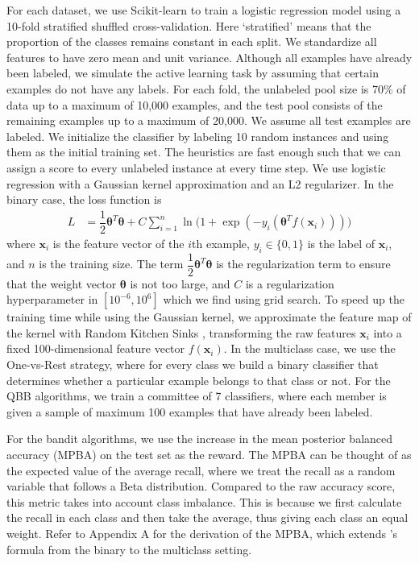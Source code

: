 \documentclass[fleqn,10pt,lineno]{wlpeerj} %
\begin{document}
For each dataset, we use Scikit-learn \citep{pedregosa11} to train a logistic
regression model using a 10-fold stratified shuffled cross-validation.
Here `stratified' means that the proportion of the classes remains constant in each
split. We standardize all features to have zero mean and unit variance.
Although all examples have already been labeled, we simulate the active
learning task by assuming that certain examples do not have any labels. For
each fold, the unlabeled pool size is 70\% of data up to a maximum of 10,000
examples, and the test pool consists of the remaining examples up to a maximum
of 20,000. We assume all test examples are labeled. We initialize the
classifier by labeling 10 random instances and using them as the initial
training set. The heuristics are fast enough such that we can assign a score to
every unlabeled instance at every time step. We use logistic regression with a
Gaussian kernel approximation and an L2 regularizer. In the binary case, the
loss function is
\begin{align}
	L &= \dfrac{1}{2} \bm{\theta}^T \bm{\theta} + C \sum_{i = 1}^n
	      \ln\Big(1 + \exp(-y_i(\bm{\theta}^T f(\bm{x}_i)))\Big)
\end{align}
where $\bm{x}_i$ is the feature vector of the $i$th example, $y_i \in \{0, 1\}$
is the label of $\bm{x}_i$, and $n$ is the training size. The term
$\dfrac{1}{2} \bm{\theta}^T \bm{\theta}$ is the regularization term to ensure
that the weight vector $\bm{\theta}$ is not too large, and $C$ is a
regularization hyperparameter in $[10^{-6}, 10^6]$ which we find using grid
search. To speed up the training time while using the Gaussian kernel, we
approximate the feature map of the kernel with Random Kitchen Sinks
\citep{rahimi08}, transforming the raw features $\bm{x}_i$ into a fixed
100-dimensional feature vector $f(\bm{x}_i)$. In the multiclass case, we use
the One-vs-Rest strategy, where for every class we build a binary classifier
that determines whether a particular example belongs to that class or not. For
the QBB algorithms, we train a committee of 7 classifiers, where each member is
given a sample of maximum 100 examples that have already been labeled.

For the bandit algorithms, we use the increase in the mean posterior balanced
accuracy (MPBA) on the test set as the reward. The MPBA can be thought of as
the expected value of the average recall, where we treat the recall as a random
variable that follows a Beta distribution. Compared to the raw accuracy score,
this metric takes into account class imbalance. This is because we first
calculate the recall in each class and then take the average, thus giving each
class an equal weight. Refer to Appendix A for the derivation of the MPBA,
which extends \cite{brodersen10}'s formula from the binary to the multiclass
setting.
\end{document}
